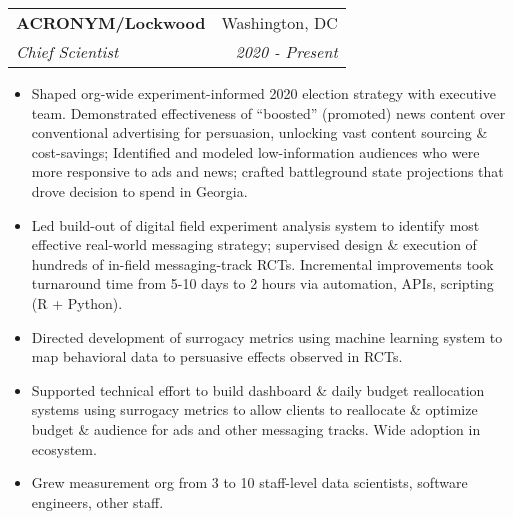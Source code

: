\documentclass[letterpaper,11pt]{article}
\makeatletter
\newcommand{\resitem}[1]{\item #1 \vspace{-6pt}}
\newcommand{\ressubheading}[4]{\vspace{2pt}
\begin{tabular*}{7.58in}{l@{\extracolsep{\fill}}r}
		\textbf{#1} & #2 \\
		\textit{#3} & \textit{#4} \\
\end{tabular*}\vspace{-1pt}}
\makeatother
\begin{document}
\ressubheading{ACRONYM/Lockwood}{Washington, DC}{Chief Scientist}{2020 - Present}
	\begin{itemize}
       	 	\resitem{Shaped org-wide experiment-informed 2020 election strategy with executive team. Demonstrated effectiveness of ``boosted'' (promoted) news content over conventional advertising for persuasion, unlocking vast content sourcing \& cost-savings; Identified and modeled low-information audiences who were more responsive to ads and news; crafted battleground state projections that drove decision to spend in Georgia.}
		\resitem{Led build-out of digital field experiment analysis system to identify most effective real-world messaging strategy; supervised design \& execution of hundreds of in-field messaging-track RCTs. Incremental improvements took turnaround time from 5-10 days to 2 hours via automation, APIs, scripting (R + Python).}
		\resitem{Directed development of surrogacy metrics using machine learning system to map behavioral data to persuasive effects observed in RCTs.} %
		\resitem{Supported technical effort to build dashboard \& daily budget reallocation systems using surrogacy metrics to allow clients to reallocate \& optimize budget \& audience for ads and other messaging tracks. Wide adoption in ecosystem.}
		\resitem{Grew measurement org from 3 to 10 staff-level data scientists, software engineers, other staff.}
	\end{itemize}
\end{document}
